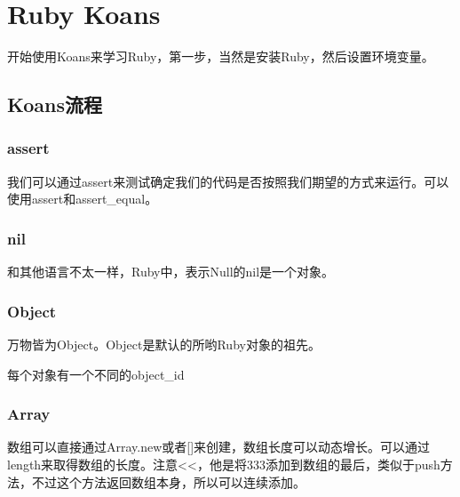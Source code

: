 \chapter{Ruby Koans}

开始使用Koans来学习Ruby，第一步，当然是安装Ruby，然后设置环境变量。

\section{Koans流程}

\subsection{assert}

我们可以通过assert来测试确定我们的代码是否按照我们期望的方式来运行。可以使用assert和assert\_equal。





\subsection{nil}

和其他语言不太一样，Ruby中，表示Null的nil是一个对象。









\subsection{Object}
万物皆为Object。Object是默认的所哟Ruby对象的祖先。



每个对象有一个不同的object\_id


\subsection{Array}
数组可以直接通过Array.new或者[]来创建，数组长度可以动态增长。可以通过length来取得数组的长度。注意<<，他是将333添加到数组的最后，类似于push方法，不过这个方法返回数组本身，所以可以连续添加。

